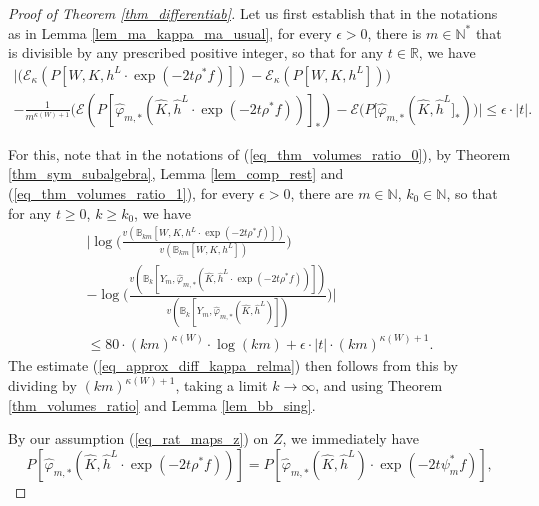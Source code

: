 \documentclass[12pt]{article}
\numberwithin{equation}{section}
\theoremstyle{theorem}
\theoremstyle{definition}
\theoremstyle{remark}
\newcommand{\vol}{v}
\newcommand{\real}{\mathbb{R}}
\newcommand{\nat}{\mathbb{N}}
\begin{document}
	\begin{proof}[Proof of Theorem \ref{thm_differentiab}]
		Let us first establish that in the notations as in Lemma \ref{lem_ma_kappa_ma_usual}, for every $\epsilon > 0$, there is $m \in \nat^*$ that is divisible by any prescribed positive integer, so that for any $t \in \real$, we have
		\begin{multline}\label{eq_approx_diff_kappa_relma}
			\Big|
				\big(
				\mathscr{E}_{\kappa}(P[W, K, h^L \cdot \exp(- 2 t \rho^* f)])
				-
				\mathscr{E}_{\kappa}(P[W, K, h^L])
				\big)
				\\
				-
				\frac{1}{m^{\kappa(W) + 1}}
				\big(
				\mathscr{E}(P[\widehat{\varphi}_{m, *} (\widehat{K}, \widehat{h}^L \cdot \exp(- 2 t \rho^* f))]_*)
				-
				\mathscr{E}(P[\widehat{\varphi}_{m, *} (\widehat{K}, \widehat{h}^L]_*)
				\big)
			\Big|
			\leq 
			\epsilon \cdot |t|.
		\end{multline}
		\par 
		For this, note that in the notations of (\ref{eq_thm_volumes_ratio_0}), by Theorem \ref{thm_sym_subalgebra}, Lemma \ref{lem_comp_rest} and (\ref{eq_thm_volumes_ratio_1}), for every $\epsilon > 0$, there are $m \in \nat$, $k_0 \in \nat$, so that for any $t \geq 0$, $k \geq k_0$, we have
		\begin{multline}
			\Big|
			\log \Big(\frac{\vol(\mathbb{B}_{km}[W, K, h^L  \cdot \exp(- 2 t \rho^* f)])}{\vol(\mathbb{B}_{km}[W, K, h^L])} \Big)
			\\
			-
			\log\Big( 
			\frac{\vol(\mathbb{B}_k[Y_m, \widehat{\varphi}_{m, *} (\widehat{K}, \widehat{h}^L \cdot \exp(- 2 t \rho^* f))])}{\vol(\mathbb{B}_k[Y_m, \widehat{\varphi}_{m, *} (\widehat{K}, \widehat{h}^L)])}
			\Big)
			\Big|
			\\
			\leq
			80 \cdot (km)^{\kappa(W)} \cdot \log(km)
			+
			\epsilon \cdot |t| \cdot (km)^{\kappa(W) + 1}.
		\end{multline}
		The estimate (\ref{eq_approx_diff_kappa_relma}) then follows from this by dividing by $(km)^{\kappa(W) + 1}$, taking a limit $k \to \infty$, and using Theorem \ref{thm_volumes_ratio} and Lemma \ref{lem_bb_sing}.
		\par 
		By our assumption (\ref{eq_rat_maps_z}) on $Z$, we immediately have
		\begin{equation}\label{eq_env_birrrr}
			P[\widehat{\varphi}_{m, *} (\widehat{K}, \widehat{h}^L \cdot \exp(- 2 t \rho^* f))]
			=
			P[\widehat{\varphi}_{m, *} (\widehat{K}, \widehat{h}^L) \cdot \exp(- 2 t \psi_m^* f)],
		\end{equation}

\end{proof}
\end{document}
